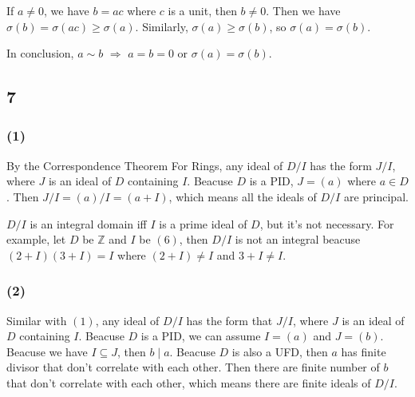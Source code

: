 \documentclass[draft]{article}
\begin{document}
				If $a \neq 0$, we have $b = ac$ where $c$ is a unit, then $b \neq 0$.
				Then we have $\sigma(b) = \sigma(ac) \geq \sigma(a)$. Similarly,
				$\sigma(a) \geq \sigma(b)$, so $\sigma(a) = \sigma(b)$.

				In conclusion, $a \sim b$ $\Rightarrow$ $a = b = 0$ or $\sigma(a) = \sigma(b)$.
		\subsection*{7}
			\subsubsection*{(1)}
				By the Correspondence Theorem For Rings, any ideal of $D/I$ has the form $J/I$, 
				where $J$ is an ideal of $D$ containing $I$. Beacuse $D$ is a PID, $J =
				(a)$ where $a \in D$. Then $J/I = (a)/I = (a+I)$, which means all the 
				ideals of $D/I$ are principal.

				$D/I$ is an integral domain iff $I$ is a prime ideal of $D$, but it's not
				necessary. For example, let $D$ be $\mathbb{Z}$ and $I$ be $(6)$, then
				$D/I$ is not an integral beacuse $(2+I)(3+I) = I$ where $(2+I)\neq I$ and
				$3+I\neq I$.
			\subsubsection*{(2)}
				Similar with $(1)$, any ideal of $D/I$ has the form that $J/I$, where
				$J$ is an ideal of $D$ containing $I$. Beacuse $D$ is a PID, we can
				assume $I = (a)$ and $J = (b)$. Beacuse we have $I \subseteq J$, then $b
				\mid a$. Beacuse $D$ is also a UFD, then $a$ has finite divisor that
				don't correlate with each other. Then there are finite number of $b$
				that don't correlate with each other, which means there are finite
				ideals of $D/I$.
\end{document}
